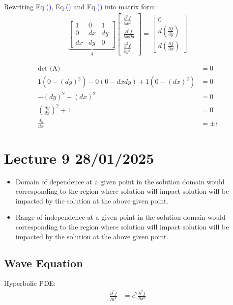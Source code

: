 \documentclass[fleqn,10pt]{SelfArx} %
\newcommand{\myeqref}[1]{Eq.\textcolor{blue}{\textup{(\getrefnumber{#1})}}}
\begin{document}
Rewriting \myeqref{eq:8.7}, \myeqref{eq:8.8} and \myeqref{eq:8.9} into matrix form:
\begin{align*}
	\underbrace{
		\begin{bmatrix}
			1 & 0  & 1 \\
			0   & dx & dy \\
			dx  & dy & 0
		\end{bmatrix}}_{\text{A}}
	\begin{bmatrix}
		\frac{\partial^2 f}{\partial x^2}          \\
		\frac{\partial^2 f}{\partial x \partial y} \\
		\frac{\partial^2 f}{\partial y^2}
	\end{bmatrix}
	= \begin{bmatrix}
		  0                                        \\
		  d\left(\frac{\partial f}{\partial y}\right) \\
		  d\left(\frac{\partial f}{\partial x}\right)
	  \end{bmatrix}
\end{align*}

\begin{align*}
	\text{det (A)}                        & = 0 \\
	1(0-(dy)^2) - 0(0-dxdy) + 1(0-(dx)^2) & = 0 \\
	-(dy)^2 - (dx)^2                      & = 0 \\
	\left(\frac{dy}{dx}\right)^2 + 1         & = 0 \\
	\frac{dy}{dx}                         & = \pm \iota
\end{align*}

\clearpage

\section{Lecture 9 28/01/2025}
\begin{itemize}
	\item Domain of dependence at a given point in the solution domain would corresponding to the region where solution will impact solution will be impacted by the solution at the above given point.
	\item Range of independence at a given point in the solution domain would corresponding to the region where solution will impact solution will be impacted by the solution at the above given point.
\end{itemize}

\subsection{Wave Equation}
Hyperbolic PDE:
\begin{align*}
	\frac{\partial^2 f}{\partial t^2} &= c^2\frac{\partial^2 f}{\partial x^2} \tag{9.1} \label{eq:9.1}
\end{align*}
\end{document}
